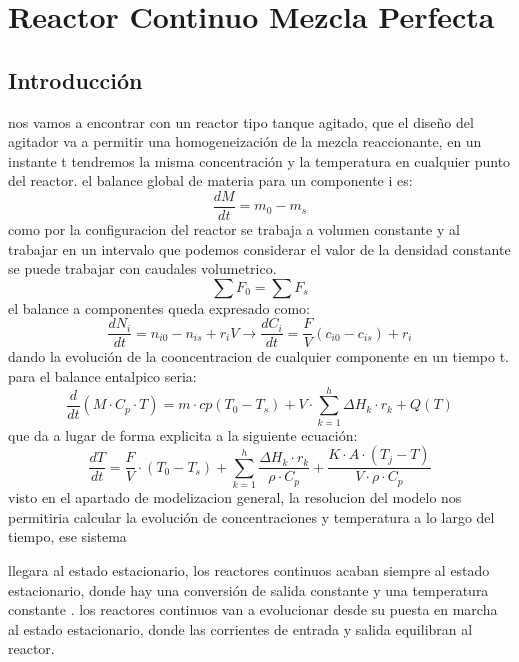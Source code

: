 \chapter{Reactor Continuo Mezcla Perfecta}
\section{Introducción}
\noindent nos vamos a encontrar con un reactor tipo tanque agitado, que el diseño del agitador va a permitir una homogeneización de la mezcla reaccionante, en un instante t tendremos la misma concentración y la temperatura en cualquier punto del reactor.
el balance global de materia para un componente i es:
\begin{equation}
	\frac{dM}{dt} = m_{0} - m_{s}
\end{equation}
como por la configuracion del reactor se trabaja a volumen constante y al trabajar en un intervalo que podemos considerar el valor de la densidad constante se puede trabajar con caudales volumetrico.
\begin{equation}
	\sum F_0 = \sum F_s
\end{equation}
el balance a componentes queda expresado como:
\begin{equation}
	\frac{dN_i}{dt} = n_{i0} - n_{is} + r_i V \rightarrow \frac{dC_i}{dt} = \frac{F}{V}(c_{i0}-c_{is})+r_i
\end{equation}
dando la evolución de la cooncentracion de cualquier componente en un tiempo t. para el balance entalpico seria:
\begin{equation}
	\frac{d}{dt}  (M\cdot C_p \cdot T) = m \cdot cp (T_0 - T_s) + V \cdot \sum_{k=1}^{h} \Delta H_k \cdot r_k + Q(T)
\end{equation}
que da a lugar de forma explicita a la siguiente ecuación:
\begin{equation}
	\frac{dT}{dt} = \frac{F}{V} \cdot (T_0 - T_s) +\sum_{k=1}^{h} \frac{\Delta H_k \cdot r_k}{\rho \cdot C_p} + \frac{K\cdot A\cdot (T_j-T)} {V\cdot \rho \cdot C_p}
\end{equation}
visto en el apartado de modelizacion general, la resolucion del modelo nos permitiria calcular la evolución de concentraciones y temperatura a lo largo del tiempo, ese sistema %

\noindent llegara al estado estacionario, los reactores continuos acaban siempre al estado estacionario, donde hay una conversión de salida constante y una temperatura constante .
los reactores continuos van a evolucionar desde su puesta en marcha al estado estacionario, donde las corrientes de entrada y salida equilibran al reactor.
